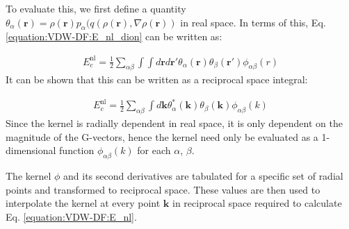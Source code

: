 \documentclass[letterpaper,10pt,english]{sphinxmanual}
\begin{document}
To evaluate this, we first define a quantity
\(\theta_{\alpha}({\mathbf{r}}) = \rho({\mathbf{r}}) p_{\alpha}(q(\rho({\mathbf{r}}),\nabla\rho({\mathbf{r}}))\)
in real space. In terms of this, Eq. \eqref{equation:VDW-DF:E_nl_dion} can be written as:

\label{\detokenize{VDW-DF:equation-e-nl-real}}\begin{equation}\label{equation:VDW-DF:E_nl_real}
\begin{split}E_c^{\mathrm{nl}} = \frac{1}{2} \sum_{\alpha\beta} \int \int d{\mathbf{r}}d{\mathbf{r}}'
\theta_{\alpha}({\mathbf{r}}) \theta_{\beta}({\mathbf{r}}') \phi_{\alpha\beta}(r)\end{split}
\end{equation}
It can be shown that this can be written as a reciprocal space integral:

\label{\detokenize{VDW-DF:equation-e-nl}}\begin{equation}\label{equation:VDW-DF:E_nl}
\begin{split}    E_c^{\mathrm{nl}} = \frac{1}{2} \sum_{\alpha\beta}\int d\mathbf{k}
    \theta^{*}_{\alpha}(\mathbf{k})\theta_{\beta}(\mathbf{k})\phi_{\alpha\beta}(k)\end{split}
\end{equation}
Since the kernel is radially dependent in real space, it is only
dependent on the magnitude of the G-vectors, hence the kernel need only
be evaluated as a 1-dimensional function \(\phi_{\alpha\beta}(k)\)
for each \(\alpha\), \(\beta\).

The kernel \(\phi\) and its second derivatives are tabulated for a
specific set of radial points and transformed to reciprocal space. These
values are then used to interpolate the kernel at every point
\(\mathbf{k}\) in reciprocal space required to calculate Eq.
\eqref{equation:VDW-DF:E_nl}.
\end{document}
